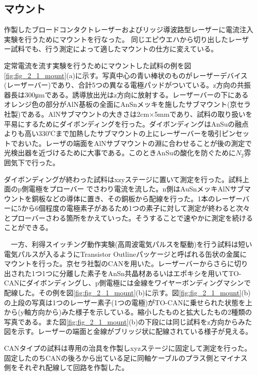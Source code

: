 \subsection{マウント}%
作製したブロードコンタクトレーザーおよびリッジ導波路型レーザーに電流注入実験を行うためにマウントを行なった。
同じエピウエハから切り出したレーザー試料でも、行う測定によって適したマウントの仕方に変えている。


定常電流を流す実験を行うためにマウントした試料の例を図\ref{fig:fig_2_1_mount}(a)に示す。写真中心の青い棒状のものがレーザーデバイス(レーザーバー)であり、合計5つの異なる電極パッドがついている。z方向の共振器長は300\si{\micro\metre}である。誘導放出光はz方向に放射する。レーザーバーの下にあるオレンジ色の部分がAlN基板の全面にAnSnメッキを施したサブマウント(京セラ社製)である。AlNサブマウントの大きさは2cm×5mmであり、試料の取り扱いを平易にするためにダイボンディングを行った。ダイボンディングはAnSuの融点よりも高い330℃まで加熱したサブマウントの上にレーザーバーを吸引ピンセットでおいた。レーザの端面をAlNサブマウントの淵に合わせることが後の測定で光検出器を近づけるために大事である。このときAnSuの酸化を防ぐために$N_{2}$雰囲気下で行った。


ダイボンディングが終わった試料はxzyステージに置いて測定を行った。試料上面のp側電極をプローバー
でさわり電流を流した。n側はAuSnメッキAlNサブマウントを銅板などの導体に置き、その銅板から配線を行った。1本のレーザーバーに5から6個程度の電極素子があるため1つの素子に対して測定が終わると次々とプローバーさわる箇所をかえていった。そうすることで速やかに測定を続けることができる。


　一方、利得スイッチング動作実験(高周波電気パルスを駆動)を行う試料は短い電気パルスが入るようにTransistor Outlineパッケージと呼ばれる缶状の金属にマウントを行った。京セラ社製のCANを用いた。レーザーバーからさらに切り出された1つ1つに分離した素子をAnSn共晶材あるいはエポキシを用いてTO-CANにダイボンディングし、p側電極には金線をワイヤーボンディングマシンで配線した。その例を図\ref{fig:fig_2_1_mount}(b)に示す。図\ref{fig:fig_2_1_mount}(b)の上段の写真は1つのレーザー素子(1つの電極)がTO-CANに乗せられた状態を上から(y軸方向から)みた様子を示している。縮小したものと拡大したもの2種類の写真である。また図\ref{fig:fig_2_1_mount}(b)の下段には同じ試料をz方向からみた図を示す。レーザーの端面と金線がブリッジ状に配線されている様子が見える。

CANタイプの試料は専用の治具を作製しxyzステージに固定して測定を行った。固定したのちCANの後ろから出ている足に同軸ケーブルのプラス側とマイナス側をそれぞれ配線して回路を作製した。

